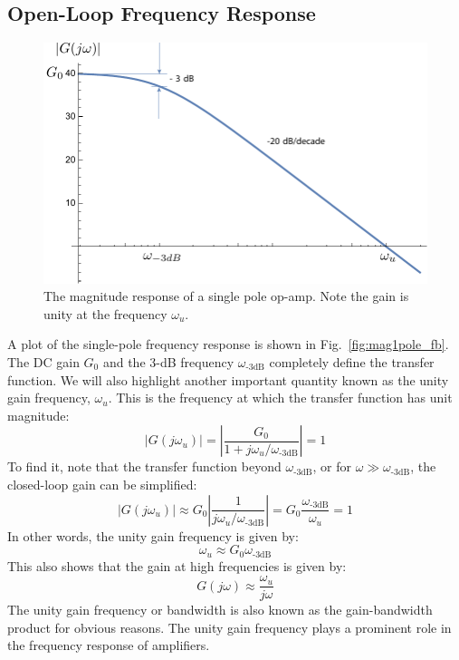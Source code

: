 \subsection{Open-Loop Frequency Response}
\begin{figure}[tb]
\begin{center}
\includegraphics[width=.7\columnwidth]{mag1pole}
\end{center}
\caption{The magnitude response of a single pole op-amp.  Note the gain is unity at the frequency $\omega_u$.}
\label{fig:mag1pole}
\end{figure}

A plot of the single-pole frequency response is shown in Fig.~\ref{fig:mag1pole_fb}.  The DC gain $G_0$ and the 3-dB frequency $\omega_{\text{-3dB}}$ completely define the transfer function.  We will also highlight another important quantity known as the unity gain frequency, $\omega_u$.  This is the frequency at which the transfer function has unit magnitude:
\begin{equation}
	|G(j\omega_u )| = \left| 
		\frac{G_0}{1 + j\omega_u/\omega_{\text{-3dB}}}
					\right| = 1
\end{equation}
To find it, note that the transfer function beyond $\omega_{\text{-3dB}}$, or for $\omega \gg \omega_{\text{-3dB}}$, the closed-loop gain can be simplified:
\begin{equation}
	|G(j\omega_u )| \approx G_0 \left| 
		\frac{1}{j\omega_u/\omega_{\text{-3dB}}}
					\right| = G_0  \frac{\omega_{\text{-3dB}}}{\omega_u}  = 1 
\end{equation}
In other words, the unity gain frequency is given by:
\begin{equation}
	\omega_u \approx G_0 \omega_{\text{-3dB}}
\end{equation}  
This also shows that the gain at high frequencies is given by:
\begin{equation}
	G(j\omega ) \approx \frac{{{\omega_u}}}{{j\omega }}
\end{equation}
The unity gain frequency or bandwidth is also known as the gain-bandwidth product for obvious reasons.   The unity gain frequency plays a prominent role in the frequency response of amplifiers.
